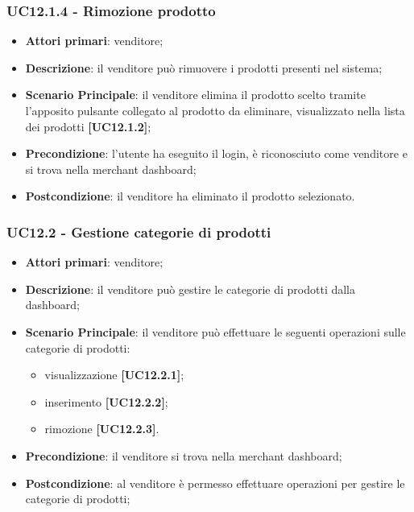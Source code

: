 \subsubsection{UC12.1.4 - Rimozione prodotto}
\begin{itemize}
\item \textbf{Attori primari}: venditore;
\item \textbf{Descrizione}: il venditore può rimuovere i prodotti presenti nel sistema;
\item \textbf{Scenario Principale}: il venditore elimina il prodotto scelto tramite l'apposito pulsante collegato al prodotto da eliminare, visualizzato nella lista dei prodotti \textbf{[UC12.1.2]};
\item \textbf{Precondizione}: l'utente ha eseguito il login, è riconosciuto come venditore e si trova nella merchant dashboard;
\item \textbf{Postcondizione}: il venditore ha eliminato il prodotto selezionato.
\end{itemize}

\subsubsection{UC12.2 - Gestione categorie di prodotti}
\begin{itemize}
\item \textbf{Attori primari}: venditore;
\item \textbf{Descrizione}: il venditore può gestire le categorie di prodotti dalla dashboard;
\item \textbf{Scenario Principale}: il venditore può effettuare le seguenti operazioni sulle categorie di prodotti:
\begin{itemize}
	\item visualizzazione \textbf{[UC12.2.1]};
	\item inserimento \textbf{[UC12.2.2]};
	\item rimozione \textbf{[UC12.2.3]}.
\end{itemize}
\item \textbf{Precondizione}: il venditore si trova nella merchant dashboard;
\item \textbf{Postcondizione}: al venditore è permesso effettuare operazioni per gestire le categorie di prodotti;
\end{itemize}

